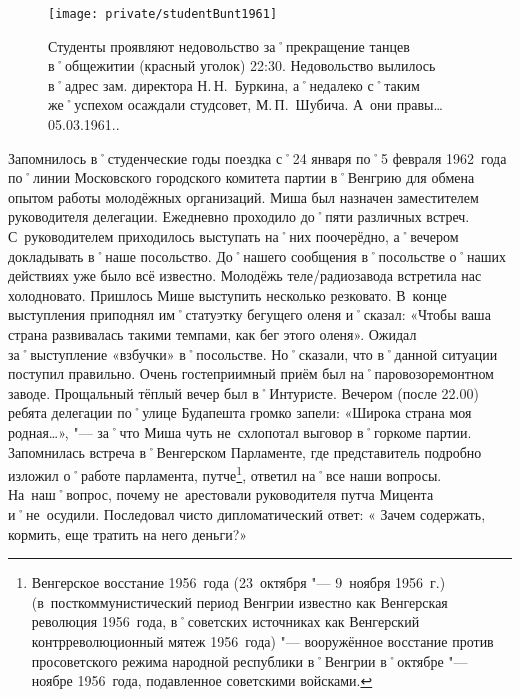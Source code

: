 \begin{figure}[h]
\texttt{[image: private/studentBunt1961]}
\caption[{Студенты проявляют недовольство за˚прекращение танцев в˚общежитии (красный уголок) 22:30. Недовольство вылилось в˚адрес зам. директора Н.\,Н.~Буркина, а˚недалеко с˚таким же˚успехом осаждали студсовет, М.\,П.~Шубича. А~они правы… 05.03.1961.}]{Студенты проявляют недовольство за˚прекращение танцев в˚общежитии (красный уголок) 22:30. Недовольство вылилось в˚адрес зам. директора Н.\,Н.~Буркина, а˚недалеко с˚таким же˚успехом осаждали студсовет, М.\,П.~Шубича. А~они правы… 05.03.1961.\footnotemark.}
\label{fig:studentBunt1961}
\end{figure}


Запомнилось в˚студенческие годы поездка с˚24 января по˚5 февраля 1962~года по˚линии Московского городского комитета партии в˚Венгрию для обмена опытом работы молодёжных организаций. Миша был назначен заместителем руководителя делегации. Ежедневно проходило до˚пяти различных встреч. С~руководителем приходилось выступать на˚них поочерёдно, а˚вечером докладывать в˚наше посольство. До˚нашего сообщения в˚посольстве о˚наших действиях уже было всё известно. Молодёжь теле\-/радиозавода встретила нас холодновато. Пришлось Мише выступить несколько резковато. В~конце выступления приподнял им˚статуэтку бегущего оленя и˚сказал: «Чтобы ваша страна развивалась такими темпами, как бег этого оленя». Ожидал за˚выступление «взбучки» в˚посольстве. Но˚сказали, что в˚данной ситуации поступил правильно. Очень гостеприимный приём был на˚паровозоремонтном заводе. Прощальный тёплый вечер был в˚Интуристе. Вечером (после 22.00) ребята делегации по˚улице Будапешта громко запели: «Широка страна моя родная…», "--- за˚что Миша чуть не~схлопотал выговор в˚горкоме партии. Запомнилась встреча в˚Венгерском Парламенте, где представитель подробно изложил о˚работе парламента, путче\footnote{Венгерское восстание 1956~года (23~октября "--- 9~ноября 1956~г.) (в~посткоммунистический период Венгрии известно как Венгерская революция 1956~года, в˚советских источниках как Венгерский контрреволюционный мятеж 1956~года) "--- вооружённое восстание против просоветского режима народной республики в˚Венгрии в˚октябре "--- ноябре 1956~года, подавленное советскими войсками.}, ответил на˚все наши вопросы. На~наш˚вопрос, почему не~арестовали руководителя путча Мицента и˚не~осудили. Последовал чисто дипломатический ответ: « Зачем содержать, кормить, еще тратить на него деньги?»

